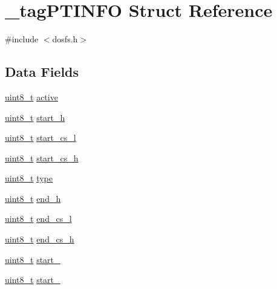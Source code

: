 \hypertarget{struct__tag_p_t_i_n_f_o}{\section{\-\_\-tag\-P\-T\-I\-N\-F\-O Struct Reference}
\label{struct__tag_p_t_i_n_f_o}
}


{\ttfamily \#include $<$dosfs.\-h$>$}

\subsection*{Data Fields}
\begin{DoxyCompactItemize}
\item 
\hyperlink{stdint_8h_aba7bc1797add20fe3efdf37ced1182c5}{uint8\-\_\-t} \hyperlink{struct__tag_p_t_i_n_f_o_aeec71d70adc7b2712171a2d240660645}{active}
\item 
\hyperlink{stdint_8h_aba7bc1797add20fe3efdf37ced1182c5}{uint8\-\_\-t} \hyperlink{struct__tag_p_t_i_n_f_o_adf2c85cde53029d5a6faecdeadce631a}{start\-\_\-h}
\item 
\hyperlink{stdint_8h_aba7bc1797add20fe3efdf37ced1182c5}{uint8\-\_\-t} \hyperlink{struct__tag_p_t_i_n_f_o_a0f4f706c223620f18b0afd6cd617784d}{start\-\_\-cs\-\_\-l}
\item 
\hyperlink{stdint_8h_aba7bc1797add20fe3efdf37ced1182c5}{uint8\-\_\-t} \hyperlink{struct__tag_p_t_i_n_f_o_a73328293e4e01310582f5f602d0c9829}{start\-\_\-cs\-\_\-h}
\item 
\hyperlink{stdint_8h_aba7bc1797add20fe3efdf37ced1182c5}{uint8\-\_\-t} \hyperlink{struct__tag_p_t_i_n_f_o_a1b91dc4e2e5424cefd0042e51eeb42e0}{type}
\item 
\hyperlink{stdint_8h_aba7bc1797add20fe3efdf37ced1182c5}{uint8\-\_\-t} \hyperlink{struct__tag_p_t_i_n_f_o_aece9485e3175c23e1f01c7cab77baaf3}{end\-\_\-h}
\item 
\hyperlink{stdint_8h_aba7bc1797add20fe3efdf37ced1182c5}{uint8\-\_\-t} \hyperlink{struct__tag_p_t_i_n_f_o_a582da9aef553ef622f3a5bb1a561505a}{end\-\_\-cs\-\_\-l}
\item 
\hyperlink{stdint_8h_aba7bc1797add20fe3efdf37ced1182c5}{uint8\-\_\-t} \hyperlink{struct__tag_p_t_i_n_f_o_a1eeadf0b960061519a8e04e0bcf6e7e3}{end\-\_\-cs\-\_\-h}
\item 
\hyperlink{stdint_8h_aba7bc1797add20fe3efdf37ced1182c5}{uint8\-\_\-t} \hyperlink{struct__tag_p_t_i_n_f_o_a8a05891a334a02820e3b060fdd1d9286}{start\-\_}
\item 
\hyperlink{stdint_8h_aba7bc1797add20fe3efdf37ced1182c5}{uint8\-\_\-t} \hyperlink{struct__tag_p_t_i_n_f_o_af3854c06b6dbf5502e8500c7074c3479}{start\-\_}

\end{DoxyCompactItemize}
